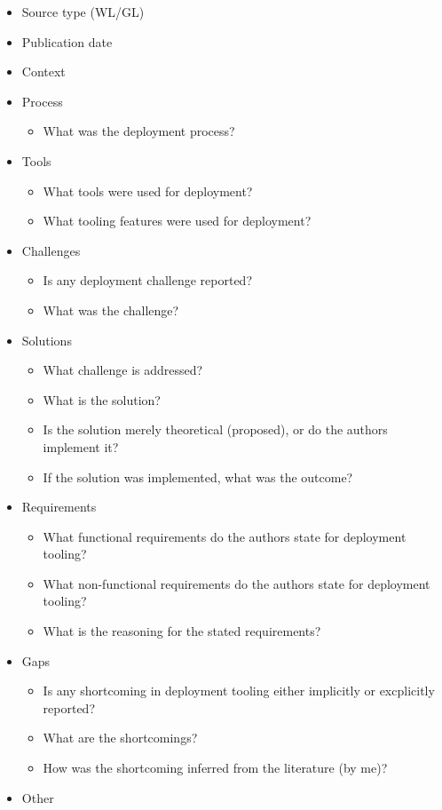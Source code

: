 \begin{itemize}
    \item Source type (WL/GL)
    \item Publication date
    \item Context
    \item Process
    \begin{itemize}
        \item What was the deployment process?
    \end{itemize}
    \item Tools
    \begin{itemize}
        \item What tools were used for deployment?
        \item What tooling features were used for deployment?
    \end{itemize}
    \item Challenges
    \begin{itemize}
        \item Is any deployment challenge reported?
        \item What was the challenge?
    \end{itemize}
    \item Solutions
    \begin{itemize}
        \item What challenge is addressed?
        \item What is the solution?
        \item Is the solution merely theoretical (proposed), or do the authors implement it?
        \item If the solution was implemented, what was the outcome?
    \end{itemize}
    \item Requirements
    \begin{itemize}
        \item What functional requirements do the authors state for deployment tooling?
        \item What non-functional requirements do the authors state for deployment tooling?
        \item What is the reasoning for the stated requirements?
    \end{itemize}
    \item Gaps
    \begin{itemize}
        \item Is any shortcoming in deployment tooling either implicitly or excplicitly reported?
        \item What are the shortcomings?
        \item How was the shortcoming inferred from the literature (by me)?
    \end{itemize}
    \item Other
\end{itemize}

